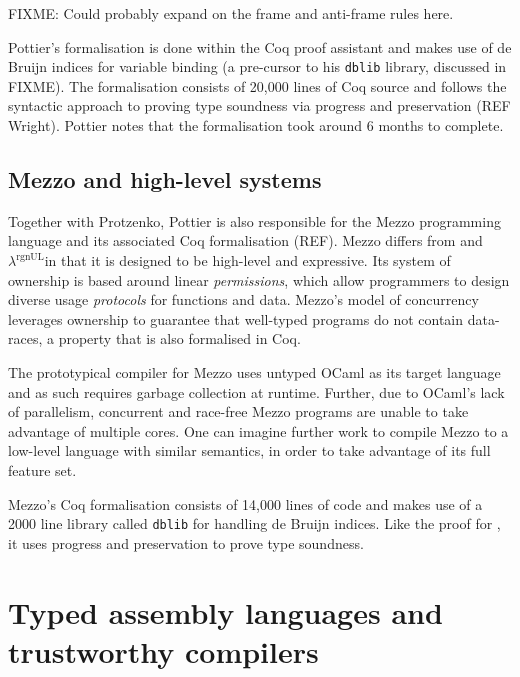 \documentclass[]{unswthesis}
\newcommand{\rgnUL}{$\lambda^\text{rgnUL}$\text{ }}
\newcommand{\SSPHS}{\text{SSPHS}}
\begin{document}
FIXME: Could probably expand on the frame and anti-frame rules here.

Pottier's formalisation is done within the Coq proof assistant and makes use of de Bruijn indices for variable binding (a pre-cursor to his \texttt{dblib} library, discussed in FIXME). The formalisation consists of 20,000 lines of Coq source and follows the syntactic approach to proving type soundness via progress and preservation (REF Wright). Pottier notes that the formalisation took around 6 months to complete.

\subsection{Mezzo and high-level systems}

Together with Protzenko, Pottier is also responsible for the Mezzo programming language and its associated Coq formalisation (REF). Mezzo differs from \SSPHS and \rgnUL in that it is designed to be high-level and expressive. Its system of ownership is based around linear \textit{permissions}, which allow programmers to design diverse usage \textit{protocols} for functions and data. Mezzo's model of concurrency leverages ownership to guarantee that well-typed programs do not contain data-races, a property that is also formalised in Coq.

The prototypical compiler for Mezzo uses untyped OCaml as its target language and as such requires garbage collection at runtime. Further, due to OCaml's lack of parallelism, concurrent and race-free Mezzo programs are unable to take advantage of multiple cores. One can imagine further work to compile Mezzo to a low-level language with similar semantics, in order to take advantage of its full feature set.

Mezzo's Coq formalisation consists of 14,000 lines of code and makes use of a 2000 line library called \texttt{dblib} for handling de Bruijn indices. Like the proof for \SSPHS, it uses progress and preservation to prove type soundness.




\section{Typed assembly languages and trustworthy compilers}
\end{document}
